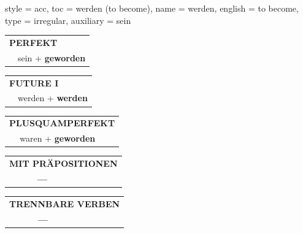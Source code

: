 \begin{verbentry}{
  style = {acc},
  toc = {werden (to become)},
  name = {werden},
  english = {to become},
  type = {irregular},
  auxiliary = {sein}
}
    \vspace{10pt}
 
    \begin{tabular}{rl}
     \multicolumn{2}{l}{\textbf{PERFEKT}}\\
   & sein + \textbf{geworden}\\
  \end{tabular}
\hfill
   \begin{tabular}{rl}
   
    \multicolumn{2}{l}{\textbf{FUTURE I} }\\
    &werden + \textbf{werden}\\
 
  \end{tabular}
\hfill
   \begin{tabular}{rl}
      \multicolumn{2}{l}{\textbf{PLUSQUAMPERFEKT}}\\
   & waren + \textbf{geworden}\\
  \end{tabular}
  
\vspace{10pt}

\begin{tabular}{lll}
\multicolumn{3}{l}{\textbf{MIT PRÄPOSITIONEN}}\\
& \textbf{---} & \\
\end{tabular}
\hfill
\begin{tabular}{lll}
\multicolumn{3}{l}{\textbf{TRENNBARE VERBEN}}\\
& \textbf{---} & \\
\end{tabular}

\vspace{-5pt}
\end{verbentry}

